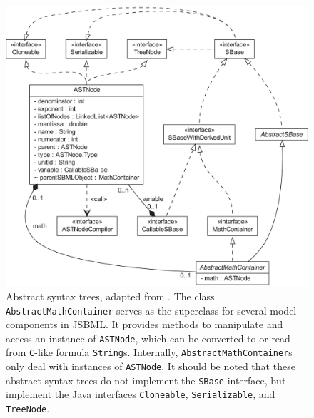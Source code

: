 \begin{figure}[t!]
 \centering
 \includegraphics[width=.8\textwidth]{img/MathContainerClass1}
 \caption[Abstract syntax trees]{Abstract syntax trees, adapted from
 \citet{Draeger2011}. The class \texttt{AbstractMathContainer} serves as the
 superclass for several model components in JSBML. It provides methods to
 manipulate and access an instance  of \texttt{ASTNode}, which can be converted
 to or read from \texttt{C}-like formula \texttt{String}s. Internally,
 \texttt{AbstractMathContainer}s only deal with instances of \texttt{ASTNode}.
 It should be noted that these abstract syntax trees do not implement the
 \texttt{SBase} interface, but implement the Java interfaces
 \texttt{Cloneable}, \texttt{Serializable}, and \texttt{TreeNode}.}
 \label{fig:MathContainer}
\end{figure}
